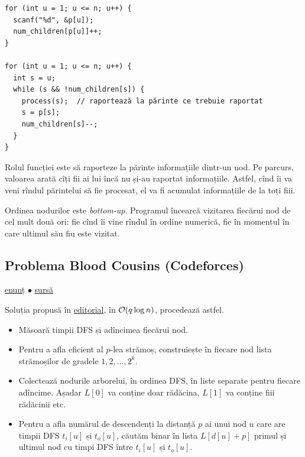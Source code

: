 \documentclass[../main.tex]{subfiles}
\begin{document}
\begin{verbatim}
for (int u = 1; u <= n; u++) {
  scanf("%d", &p[u]);
  num_children[p[u]]++;
}

for (int u = 1; u <= n; u++) {
  int s = u;
  while (s && !num_children[s]) {
    process(s);  // raportează la părinte ce trebuie raportat
    s = p[s];
    num_children[s]--;
  }
}
\end{verbatim}

Rolul funcției  este să raporteze la părinte informațiile dintr-un nod. Pe parcurs, valoarea  arată cîți fii ai lui  încă nu și-au raportat informațiile. Astfel, cînd îi va veni rîndul părintelui să fie procesat, el va fi acumulat informațiile de la toți fiii.

Ordinea nodurilor este \textit{bottom-up}. Programul încearcă vizitarea fiecărui nod de cel mult două ori: fie cînd îi vine rîndul în ordine numerică, fie în momentul în care ultimul său fiu este vizitat.

\subsection{Problema Blood Cousins (Codeforces)}
\label{problem:blood-cousins}

\href{https://codeforces.com/contest/208/problem/E}{enunț}
$\bullet$
\hyperref[code:blood-cousins]{sursă}

Soluția propusă în \href{https://codeforces.com/blog/entry/4930}{editorial}, în $\mathcal{O}(q \log n)$, procedează astfel.

\begin{itemize}
  \item Măsoară timpii DFS și adîncimea fiecărui nod.

  \item Pentru a afla eficient al $p$-lea strămoș, construiește în fiecare nod lista strămoșilor de gradele $1, 2, \dots, 2^k$.

  \item Colectează nodurile arborelui, în ordinea DFS, în liste separate pentru fiecare adîncime. Așadar $L[0]$ va conține doar rădăcina, $L[1]$ va conține fiii rădăcinii etc.

  \item Pentru a afla numărul de descendenți la distanță $p$ ai unui nod $u$ care are timpii DFS $t_i[u]$ și $t_o[u]$, căutăm binar în lista $L[d[u] + p]$ primul și ultimul nod cu timpi DFS între $t_i[u]$ și $t_o[u]$.
\end{itemize}
\end{document}

